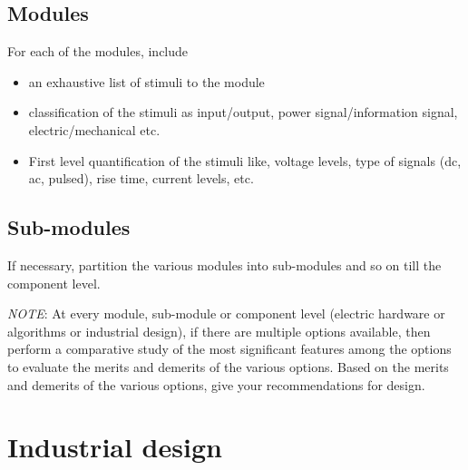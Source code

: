 \subsection{Modules}

For each of the modules, include
\begin{itemize}
\item an exhaustive list of stimuli to the module
\item classification of the stimuli as input/output, power signal/information
signal, electric/mechanical etc.
\item First level quantification of the stimuli like, voltage levels, type
of signals (dc, ac, pulsed), rise time, current levels, etc.
\end{itemize}

\subsection{Sub-modules}

If necessary, partition the various modules into sub-modules and so
on till the component level. 

\emph{NOTE}: At every module, sub-module or component level (electric
hardware or algorithms or industrial design), if there are multiple
options available, then perform a comparative study of the most significant
features among the options to evaluate the merits and demerits of
the various options. Based on the merits and demerits of the various
options, give your recommendations for design.

\section{Industrial design}

